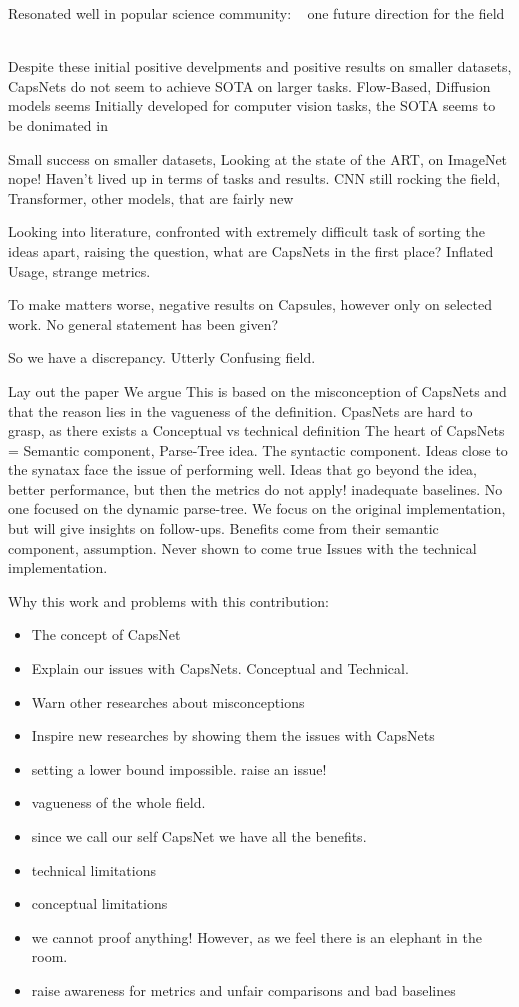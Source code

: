 \documentclass{article}
\begin{document}
Resonated well in popular science community:
~\cite{comacm/Bengio2021} one future direction for the field
~\cite{book/hawkins2021}
~\cite{book/Hiesinger2021}

Despite these initial positive develpments and positive results on smaller datasets, CapsNets do not seem to achieve SOTA on larger tasks.
Flow-Based, Diffusion models seems
Initially developed for computer vision tasks, the SOTA seems to be donimated in 

Small success on smaller datasets, Looking at the state of the ART, on ImageNet nope!
Haven't lived up in terms of tasks and results.
CNN still rocking the field, Transformer, other models, that are fairly new

Looking into literature, confronted with extremely difficult task of sorting the ideas apart, raising the question, what are CapsNets in the first place? Inflated Usage, strange metrics.

To make matters worse, negative results on Capsules, however only on selected work. No general statement has been given?

So we have a discrepancy.
Utterly Confusing field.

Lay out the paper
We argue This is based on the misconception of CapsNets and that the reason lies in the vagueness of the definition.
CpasNets are hard to grasp, as there exists a Conceptual vs technical definition
The heart of CapsNets = Semantic component, Parse-Tree idea.
The syntactic component.
Ideas close to the synatax face the issue of performing well.
Ideas that go beyond the idea, better performance, but then the metrics do not apply! inadequate baselines.
No one focused on the dynamic parse-tree.
We focus on the original implementation, but will give insights on follow-ups.
Benefits come from their semantic component, assumption. Never shown to come true
Issues with the technical implementation.

Why this work and problems with this contribution:
\begin{itemize}
	\item The concept of CapsNet
	\item Explain our issues with CapsNets. Conceptual and Technical.
	\item Warn other researches about misconceptions
	\item Inspire new researches by showing them the issues with CapsNets
	\item setting a lower bound impossible. raise an issue!
	\item vagueness of the whole field.
	\item since we call our self CapsNet we have all the benefits.
	\item technical limitations
	\item conceptual limitations
	\item we cannot proof anything! However, as we feel there is an elephant in the room.
	\item raise awareness for metrics and unfair comparisons and bad baselines
\end{itemize}
\end{document}
